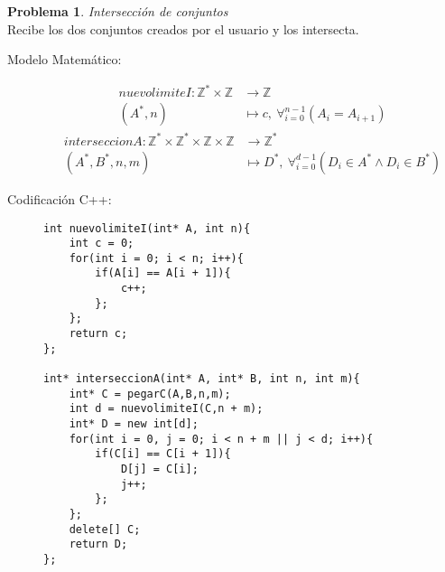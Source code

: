 \documentclass{article}
\theoremstyle{plain}
\theoremstyle{definition}
\newtheorem{problem}{Problema}
\begin{document}
\begin{problem} \emph{Intersección de conjuntos}\\
Recibe los dos conjuntos creados por el usuario y los intersecta.
\begin{description}
\item[Modelo Matemático:]
%
\begin{align*}
nuevolimiteI: \mathbb{Z}^*\times\mathbb{Z}&\to \mathbb{Z}\\
(A^*,n) &\mapsto c,\ \forall_{i=0}^{n-1}(A_i=A_{i+1})
\end{align*}
%
\begin{align*}
interseccionA: \mathbb{Z}^*\times\mathbb{Z}^*\times\mathbb{Z}\times\mathbb{Z}&\to \mathbb{Z}^*\\
(A^*,B^*,n,m) &\mapsto D^*,\ \forall_{i=0}^{d-1}(D_i \in A^* \land D_i \in B^*)
\end{align*}
%
\item[Codificación \textsf{C++}:]\hfill
%
\begin{verbatim}
int nuevolimiteI(int* A, int n){
    int c = 0;
    for(int i = 0; i < n; i++){
        if(A[i] == A[i + 1]){
            c++;
        };
    };
    return c;
};

int* interseccionA(int* A, int* B, int n, int m){
    int* C = pegarC(A,B,n,m);
    int d = nuevolimiteI(C,n + m);
    int* D = new int[d];
    for(int i = 0, j = 0; i < n + m || j < d; i++){
        if(C[i] == C[i + 1]){
            D[j] = C[i];
            j++;
        };
    };
    delete[] C;
    return D;
};
\end{verbatim}
\end{description}
\end{problem}
\end{document}
